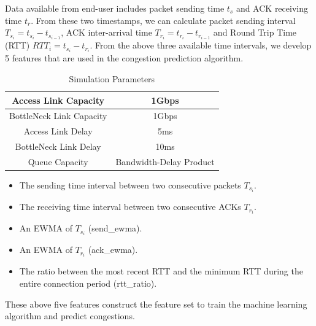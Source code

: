 \par Data available from end-user includes packet sending time $t_{s}$ and ACK receiving time $t_{r}$. From these two timestamps, we can calculate packet sending interval $T_{s_{i}} = t_{s_{i}} - t_{s_{i-1}}$, ACK inter-arrival time $T_{r_{i}} = t_{r_{i}} - t_{r_{i-1}}$ and Round Trip Time (RTT) $RTT_{i} = t_{s_{i}} - t_{r_{i}}$. From the above three available time intervals, we develop 5 features that are used in the congestion prediction algorithm.
\begin{table}
\begin{center}
\caption {Simulation Parameters} \label{tab:simuPara}
\begin{tabular}{ |c|c| }
 \hline
 Access Link Capacity & 1Gbps  \\
 \hline
 BottleNeck Link Capacity & 1Gbps  \\
 \hline
 Access Link Delay & 5ms  \\
 \hline
 BottleNeck Link Delay & 10ms\\
 \hline
 Queue Capacity & Bandwidth-Delay Product\\
 \hline
\end{tabular}
\end{center}
\end{table}
\begin{itemize}
\item The sending time interval between two consecutive packets $T_{s_{i}}$.
\item The receiving time interval between two consecutive ACKs $T_{r_{i}}$.
\item An EWMA of $T_{s_{i}}$ (send\_ewma).
\item An EWMA of $T_{r_{i}}$ (ack\_ewma).
\item The ratio between the most recent RTT and the minimum RTT during the entire connection period (rtt\_ratio).
\end{itemize}

These above five features construct the feature set to train the machine learning algorithm and predict congestions.

